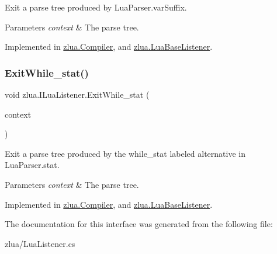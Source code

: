 Exit a parse tree produced by Lua\+Parser.\+var\+Suffix. 


\begin{DoxyParams}{Parameters}
{\em context} & The parse tree.\\
\hline
\end{DoxyParams}


Implemented in \mbox{\hyperlink{classzlua_1_1_compiler_aae7819794cccd6cfa7ccedcdb6c69a78}{zlua.\+Compiler}}, and \mbox{\hyperlink{classzlua_1_1_lua_base_listener_af8716e19b6123340f1a13c0ecf019d06}{zlua.\+Lua\+Base\+Listener}}.

\mbox{\label{interfacezlua_1_1_i_lua_listener_ab7cdf0dd588b664e1f8efbca0a03884e}} 
\subsubsection{\texorpdfstring{Exit\+While\+\_\+stat()}{ExitWhile\_stat()}}
{\footnotesize\ttfamily void zlua.\+I\+Lua\+Listener.\+Exit\+While\+\_\+stat (\begin{DoxyParamCaption}\item[{\mbox{[}\+Not\+Null\mbox{]} \mbox{\hyperlink{classzlua_1_1_lua_parser_1_1_while__stat_context}{Lua\+Parser.\+While\+\_\+stat\+Context}}}]{context }\end{DoxyParamCaption})}



Exit a parse tree produced by the {\ttfamily while\+\_\+stat} labeled alternative in Lua\+Parser.\+stat. 


\begin{DoxyParams}{Parameters}
{\em context} & The parse tree.\\
\hline
\end{DoxyParams}


Implemented in \mbox{\hyperlink{classzlua_1_1_compiler_ab9803e477ce65ab3eec9f6013082b4ed}{zlua.\+Compiler}}, and \mbox{\hyperlink{classzlua_1_1_lua_base_listener_a35e673f6a18bfef7e92e04ef244093fc}{zlua.\+Lua\+Base\+Listener}}.



The documentation for this interface was generated from the following file\+:\begin{DoxyCompactItemize}
\item 
zlua/Lua\+Listener.\+cs\end{DoxyCompactItemize}
